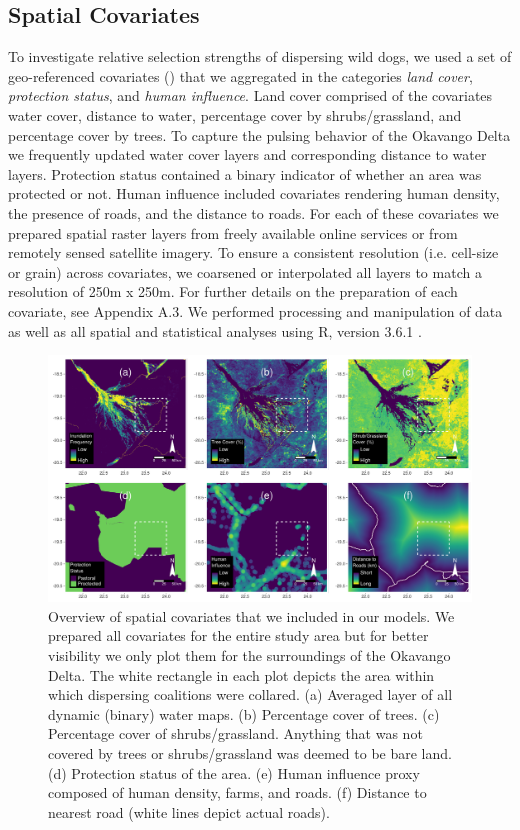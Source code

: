 \documentclass[abstract=on,10pt,a4paper,bibliography=totocnumbered]{article}
\begin{document}
\subsection{Spatial Covariates}
To investigate relative selection strengths  of
dispersing wild dogs, we used a set of geo-referenced covariates
() that we aggregated in the categories \textit{land cover},
\textit{protection status}, and \textit{human influence}. Land cover comprised
of the covariates water cover, distance to water, percentage cover by
shrubs/grassland, and percentage cover by trees. To capture the pulsing behavior
of the Okavango Delta we frequently updated water cover layers and corresponding
distance to water layers. Protection status contained a binary indicator of
whether an area was protected or not. Human influence included covariates
rendering human density, the presence of roads, and the distance to
roads. For each
of these covariates we prepared spatial raster layers from freely available
online services or from remotely sensed satellite imagery. To ensure a
consistent resolution (i.e. cell-size or grain) across covariates, we coarsened
or interpolated all layers to match a resolution of 250m x 250m. For further
details on the preparation of each covariate, see Appendix A.3. We performed
processing and manipulation of data as well as all spatial and statistical
analyses using R, version 3.6.1 \citep{R.2019}.

\begin{figure}[h]
  \begin{center}
    \includegraphics[width = \textwidth]{99_Covariates.pdf}
    \caption{Overview of spatial covariates that we included in our models. We
    prepared all covariates for the entire study area but for better visibility
    we only plot them for the surroundings of the Okavango Delta. The white
    rectangle in each plot depicts the area within which dispersing coalitions
    were collared. (a) Averaged layer of all dynamic (binary) water maps. (b)
    Percentage cover of trees. (c) Percentage cover of shrubs/grassland.
    Anything that was not covered by trees or shrubs/grassland was deemed to be
    bare land. (d) Protection status of the area. (e) Human influence proxy
    composed of human density, farms, and roads. (f) Distance to nearest road
    (white lines depict actual roads).}
    \label{Covariates}
  \end{center}
\end{figure}
\end{document}

